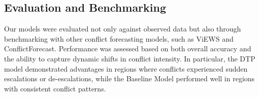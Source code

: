 \documentclass[twocolumn]{erdc}
\begin{document}
\subsection*{Evaluation and Benchmarking}

Our models were evaluated not only against observed data but also through benchmarking with other conflict forecasting models, such as ViEWS and ConflictForecast. Performance was assessed based on both overall accuracy and the ability to capture dynamic shifts in conflict intensity. In particular, the DTP model demonstrated advantages in regions where conflicts experienced sudden escalations or de-escalations, while the Baseline Model performed well in regions with consistent conflict patterns. 



\end{document}

